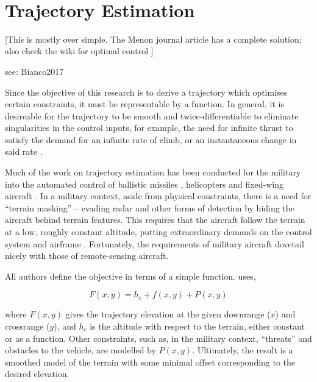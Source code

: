 ~~~




\section{Trajectory Estimation}

[This is mostly over simple. The Menon journal article has a complete solution; also check the wiki for optimal control ]

see: Bianco2017


Since the objective of this research is to derive a trajectory which optimises certain constraints, it must be representable by a function. In general, it is desireable for the trajectory to be smooth and twice-differentiable to eliminate singularities in the control inputs, for example, the need for infinite thrust to satisfy the demand for an infinite rate of climb, or an instantaneous change in said rate \cite{MENON1991,Funk1977}. 

Much of the work on trajectory estimation has been conducted for the military into the automated control of ballistic missiles \cite{Dressler1968}, helicopters and fixed-wing aircraft \cite{MENON1991,Funk1977}. In a military context, aside from physical constraints, there is a need for ``terrain masking'' -- evading radar and other forms of detection by hiding the aircraft behind terrain features. This requires that the aircraft follow the terrain at a low, roughly constant altitude, putting extraordinary demands on the control system and airframe \cite{MENON1991}. Fortunately, the requirements of military aircraft dovetail nicely with those of remote-sensing aircraft.

All authors define the objective in terms of a simple function. \cite{MENON1991} uses, 

\begin{equation}
F(x,y) = h_c + f(x,y) + P(x,y)
\end{equation}

where $F(x,y)$ gives the trajectory elevation at the given downrange ($x$) and crossrange ($y$), and $h_c$ is the altitude with respect to the terrain, either constant or as a function. Other constraints, such as, in the military context, ``threats'' and obstacles to the vehicle, are modelled by $P(x,y)$. Ultimately, the result is a smoothed model of the terrain with some minimal offset corresponding to the desired elevation.

